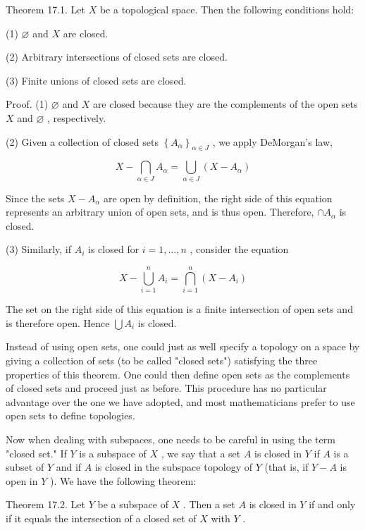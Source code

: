 Theorem 17.1. Let \(X\) be a topological space. Then the following conditions hold:

(1) \(\varnothing\) and \(X\) are closed.

(2) Arbitrary intersections of closed sets are closed.

(3) Finite unions of closed sets are closed.

Proof. (1) \(\varnothing\) and \(X\) are closed because they are the complements of the open sets \(X\) and \(\varnothing\) , respectively.

(2) Given a collection of closed sets \({\left\{  {A}_{\alpha }\right\}  }_{\alpha  \in  J}\) , we apply DeMorgan’s law,

\[
X - \mathop{\bigcap }\limits_{{\alpha  \in  J}}{A}_{\alpha } = \mathop{\bigcup }\limits_{{\alpha  \in  J}}\left( {X - {A}_{\alpha }}\right)
\]

Since the sets \(X - {A}_{\alpha }\) are open by definition, the right side of this equation represents an arbitrary union of open sets, and is thus open. Therefore, \(\cap  {A}_{\alpha }\) is closed.

(3) Similarly, if \({A}_{i}\) is closed for \(i = 1,\ldots ,n\) , consider the equation

\[
X - \mathop{\bigcup }\limits_{{i = 1}}^{n}{A}_{i} = \mathop{\bigcap }\limits_{{i = 1}}^{n}\left( {X - {A}_{i}}\right)
\]

The set on the right side of this equation is a finite intersection of open sets and is therefore open. Hence \(\bigcup {A}_{i}\) is closed.

Instead of using open sets, one could just as well specify a topology on a space by giving a collection of sets (to be called "closed sets") satisfying the three properties of this theorem. One could then define open sets as the complements of closed sets and proceed just as before. This procedure has no particular advantage over the one we have adopted, and most mathematicians prefer to use open sets to define topologies.

Now when dealing with subspaces, one needs to be careful in using the term "closed set." If \(Y\) is a subspace of \(X\) , we say that a set \(A\) is closed in \(Y\) if \(A\) is a subset of \(Y\) and if \(A\) is closed in the subspace topology of \(Y\) (that is, if \(Y - A\) is open in \(Y\) ). We have the following theorem:

Theorem 17.2. Let \(Y\) be a subspace of \(X\) . Then a set \(A\) is closed in \(Y\) if and only if it equals the intersection of a closed set of \(X\) with \(Y\) .

